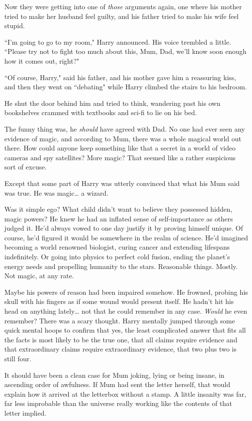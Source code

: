 Now they were getting into one of \emph{those} arguments again, one where his mother tried to make her husband feel guilty, and his father tried to make his wife feel stupid.

``I'm going to go to my room," Harry announced. His voice trembled a little. ``Please try not to fight too much about this, Mum, Dad, we'll know soon enough how it comes out, right?"

``Of course, Harry," said his father, and his mother gave him a reassuring kiss, and then they went on ``debating" while Harry climbed the stairs to his bedroom.

He shut the door behind him and tried to think, wandering past his own bookshelves crammed with textbooks and sci-fi to lie on his bed.

The funny thing was, he \emph{should} have agreed with Dad. No one had ever seen any evidence of magic, and according to Mum, there was a whole magical world out there. How could anyone keep something like that a secret in a world of video cameras and spy satellites? More magic? That seemed like a rather suspicious sort of excuse.

Except that some part of Harry was utterly convinced that what his Mum said was true. He was magic{\ldots} a wizard.

Was it simple ego? What child didn't want to believe they possessed hidden, magic powers? He knew he had an inflated sense of self-importance as others judged it. He'd always vowed to one day justify it by proving himself unique. Of course, he'd figured it would be somewhere in the realm of science. He'd imagined becoming a world renowned biologist, curing cancer and extending lifespans indefinitely. Or going into physics to perfect cold fusion, ending the planet's energy needs and propelling humanity to the stars. Reasonable things. Mostly. Not magic, at any rate.

Maybe his powers of reason had been impaired somehow. He frowned, probing his skull with his fingers as if some wound would present itself. He hadn't hit his head on anything lately{\ldots} not that he could remember in any case. \emph{Would} he even remember? There was a scary thought. Harry mentally jumped through some quick mental hoops to confirm that yes, the least complicated answer that fits all the facts is most likely to be the true one, that all claims require evidence and that extraordinary claims require extraordinary evidence, that two plus two is still four.

It should have been a clean case for Mum joking, lying or being insane, in ascending order of awfulness. If Mum had sent the letter herself, that would explain how it arrived at the letterbox without a stamp. A little insanity was far, far less improbable than the universe really working like the contents of that letter implied.

